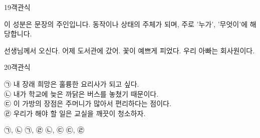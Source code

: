 \documentclass[fs95,seriesFre]{korfarm-base}
\begin{document}
\begin{kfQBlock}{19}{객관식}
\begin{kfEvidence}이 성분은 문장의 주인입니다. 동작이나 상태의 주체가 되며, 주로 '누가', '무엇이'에 해당합니다.\end{kfEvidence}
\begin{kfChoices}
\kfChoice 선생님께서 오신다.
\kfChoice 어제 도서관에 갔어.
\kfChoice 꽃이 예쁘게 피었다.
\kfChoice 우리 아빠는 회사원이다.
\end{kfChoices}
\end{kfQBlock}

\begin{kfQBlock}{20}{객관식}
\begin{kfEvidence}㉠ 내 장래 희망은 훌륭한 요리사가 되고 싶다. \\\relax
㉡ 내가 학교에 늦은 까닭은 버스를 놓쳤기 때문이다. \\\relax
㉢ 이 가방의 장점은 주머니가 많아서 편리하다는 점이다. \\\relax
㉣ 우리가 해야 할 일은 교실을 깨끗이 청소하자.\end{kfEvidence}
\begin{kfChoices}
\kfChoice ㉠, ㉡
\kfChoice ㉠, ㉣
\kfChoice ㉡, ㉢
\kfChoice ㉢, ㉣
\end{kfChoices}
\end{kfQBlock}
\end{document}
